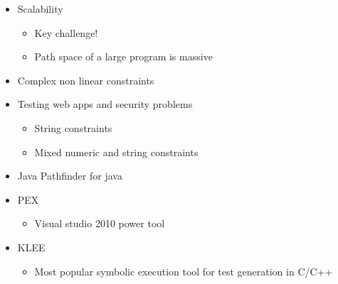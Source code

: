 \documentclass[12pt]{book}
\begin{document}
\begin{itemize}
    \item Scalability
    \begin{itemize}
        \item Key challenge!
        \item Path space of a large program is massive
    \end{itemize} 

    \item Complex non linear constraints
    \item Testing web apps and security problems
    \begin{itemize}
        \item String constraints
        \item Mixed numeric and string constraints
    \end{itemize}

    \item Java Pathfinder for java
    \item PEX
    \begin{itemize}
        \item Visual studio 2010 power tool
    \end{itemize} 

    \item KLEE
    \begin{itemize}
        \item Most popular symbolic execution tool for test generation in C/C++
    \end{itemize} 
\end{itemize}
\end{document}
